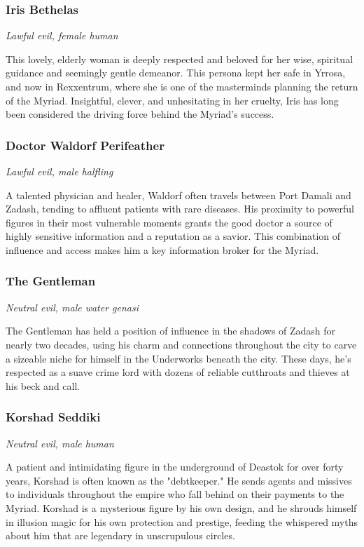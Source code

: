 \documentclass[10pt,a4paper,twoside,bg=print,twocolumn,openany,nodeprecatedcode]{dndbook}
\begin{document}
\subsubsection{Iris Bethelas}
\textit{Lawful evil, female human}

This lovely, elderly woman is deeply respected and beloved for her wise, spiritual guidance and seemingly gentle demeanor. This persona kept her safe in Yrrosa, and now in Rexxentrum, where she is one of the masterminds planning the return of the Myriad. Insightful, clever, and unhesitating in her cruelty, Iris has long been considered the driving force behind the Myriad's success.

\subsubsection{Doctor Waldorf Perifeather}
\textit{Lawful evil, male halfling}

A talented physician and healer, Waldorf often travels between Port Damali and Zadash, tending to affluent patients with rare diseases. His proximity to powerful figures in their most vulnerable moments grants the good doctor a source of highly sensitive information and a reputation as a savior. This combination of influence and access makes him a key information broker for the Myriad.

\subsubsection{The Gentleman}
\textit{Neutral evil, male water genasi}

The Gentleman has held a position of influence in the shadows of Zadash for nearly two decades, using his charm and connections throughout the city to carve a sizeable niche for himself in the Underworks beneath the city. These days, he's respected as a suave crime lord with dozens of reliable cutthroats and thieves at his beck and call.

\subsubsection{Korshad Seddiki}
\textit{Neutral evil, male human}

A patient and intimidating figure in the underground of Deastok for over forty years, Korshad is often known as the "debtkeeper." He sends agents and missives to individuals throughout the empire who fall behind on their payments to the Myriad. Korshad is a mysterious figure by his own design, and he shrouds himself in illusion magic for his own protection and prestige, feeding the whispered myths about him that are legendary in unscrupulous circles.
\end{document}
